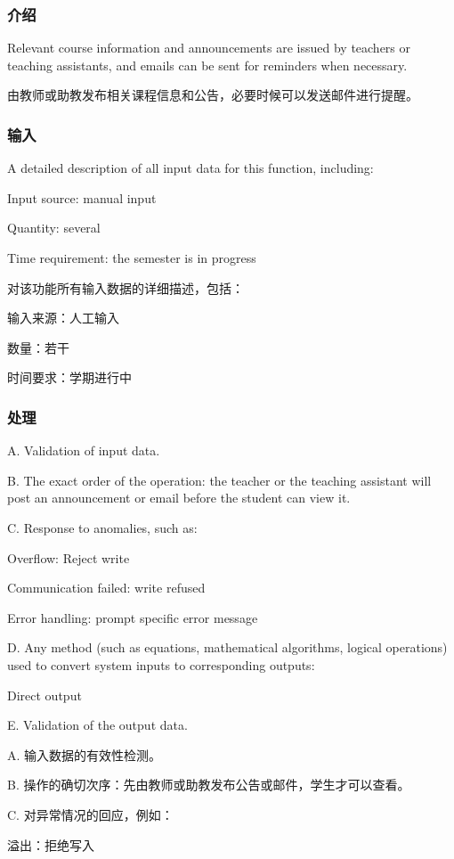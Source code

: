 \subsubsection{介绍}

Relevant course information and announcements are issued by teachers or teaching assistants, and emails can be sent for reminders when necessary.

由教师或助教发布相关课程信息和公告，必要时候可以发送邮件进行提醒。

\subsubsection{输入}
A detailed description of all input data for this function, including:

Input source: manual input

Quantity: several

Time requirement: the semester is in progress

对该功能所有输入数据的详细描述，包括：

	输入来源：人工输入

	数量：若干

	时间要求：学期进行中
	
\subsubsection{处理}
A. Validation of input data.

B. The exact order of the operation: the teacher or the teaching assistant will post an announcement or email before the student can view it.

C. Response to anomalies, such as:

Overflow: Reject write

Communication failed: write refused

Error handling: prompt specific error message

D. Any method (such as equations, mathematical algorithms, logical operations) used to convert system inputs to corresponding outputs:

Direct output

E. Validation of the output data.

A. 输入数据的有效性检测。

B. 操作的确切次序：先由教师或助教发布公告或邮件，学生才可以查看。

C. 对异常情况的回应，例如：

	溢出：拒绝写入
	
